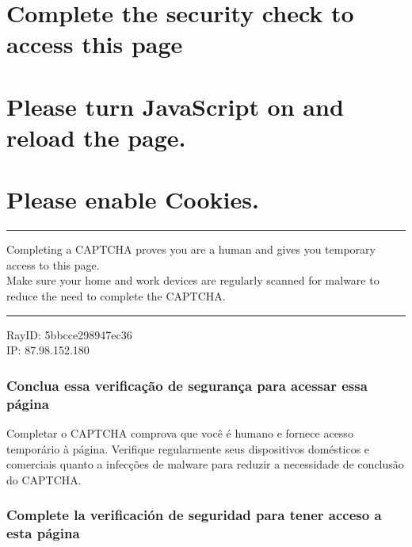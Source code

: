 \hypertarget{complete-the-security-check-to-access-this-page}{%
\section{Complete the security check to access this
page}\label{complete-the-security-check-to-access-this-page}}

\hypertarget{please-turn-javascript-on-and-reload-the-page}{%
\section{Please turn JavaScript on and reload the
page.}\label{please-turn-javascript-on-and-reload-the-page}}

\hypertarget{please-enable-cookies}{%
\section{Please enable Cookies.}\label{please-enable-cookies}}

\begin{center}\rule{0.5\linewidth}{\linethickness}\end{center}

Completing a CAPTCHA proves you are a human and gives you temporary
access to this page.\\
Make sure your home and work devices are regularly scanned for malware
to reduce the need to complete the CAPTCHA.

\begin{center}\rule{0.5\linewidth}{\linethickness}\end{center}

RayID: 5bbcce298947ec36\\
IP: 87.98.152.180

\hypertarget{conclua-essa-verificauxe7uxe3o-de-seguranuxe7a-para-acessar-essa-puxe1gina}{%
\subsubsection{Conclua essa verificação de segurança para acessar essa
página}\label{conclua-essa-verificauxe7uxe3o-de-seguranuxe7a-para-acessar-essa-puxe1gina}}

Completar o CAPTCHA comprova que você é humano e fornece acesso
temporário à página. Verifique regularmente seus dispositivos domésticos
e comerciais quanto a infecções de malware para reduzir a necessidade de
conclusão do CAPTCHA.

\hypertarget{complete-la-verificaciuxf3n-de-seguridad-para-tener-acceso-a-esta-puxe1gina}{%
\subsubsection{Complete la verificación de seguridad para tener acceso a
esta
página}\label{complete-la-verificaciuxf3n-de-seguridad-para-tener-acceso-a-esta-puxe1gina}}

